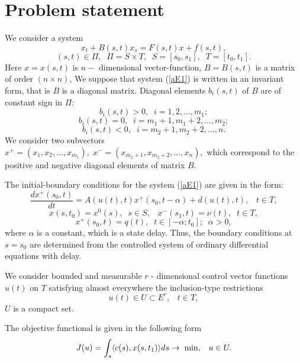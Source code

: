 \documentclass[12pt]{llncs}
\begin{document}
\section{Problem statement}
%
We consider a system
\begin{equation} \label{aE1}
x_{t} + B(s,t)x_{s} = F(s,t)x + f(s,t),
\end{equation}
$$
(s, t) \in \Pi, \;\; \Pi= S\times T, \;\; S= [s_{0}, s_{1}], \;\;  T= [t_{0}, t_{1}].
$$
Here $x= x(s, t)$ is $n - $ dimensional vector-function, $B= B(s,t)$ is a matrix of order $(n\times n)$, We suppose that system (\ref{aE1}) is written in an invariant form, that is $B$ is a diagonal matrix. Diagonal elements $b_{i}(s,t)$ of $B$ are of constant sign in $\Pi$:
$$
b_{i}(s,t)>0, \;\; i=1,2, \ldots, m_{1};
$$
$$
b_{i}(s,t)=0,\;\; i=m_{1}+ 1, m_{1}+ 2, \ldots, m_{2};
$$
$$
b_{i}(s,t)<0, \;\; i=m_{2}+ 1, m_{2}+2, \ldots, n.
$$
We consider two subvectors $ x^{+}=(x_{1}, x_{2}, \ldots, x_{m_{1}}),  \;  x^{-}= (x_{m_{2}+1}, x_{m_{2}+2}, \ldots, x_{n}),
$
which correspond to the positive and negative diagonal elements of  matrix $B$.

The initial-boundary conditions for the system (\ref{aE1}) are given in the form:
\begin{equation} \label{aE2}
\frac{dx^{+}(s_{0}, t)}{dt} = A(u(t), t) x^{+}(s_{0}, t-\alpha) + d(u(t), t), \;\;\; t\in T,
\end{equation}
$$
x(s, t_{0}) = x^0 (s), \;\; s\in S, \;\;\; x^{-}(s_{1}, t) = \nu(t), \;\; t\in T,
$$
$$
x^{+}(s_{0}, t) = q(t), \;\;  t\in [-\alpha; t_{0}];  \;\; \alpha>0,
$$
where $\alpha$ is a constant, which is a state delay. Thus, the boundary conditions at $s=s_{0}$ are determined from the controlled system of ordinary differential equations with delay.

We consider bounded and measurable $r$ - dimensional control vector functions $u(t)$ on $T$ satisfying almost everywhere  the inclusion-type restrictions
\begin{equation} \label{aE3}
u(t)\in U\subset E^r, \;\;\; t\in T,
\end{equation}
$U$ is a compact set.

The objective functional is given in the following form
\begin{equation} \label{aE4}
J(u)= \int_{s} \langle c(s), x(s, t_{1}) \rangle ds \rightarrow \; {\rm min}, \;\;\; u\in U.
\end{equation}

%
\end{document}
